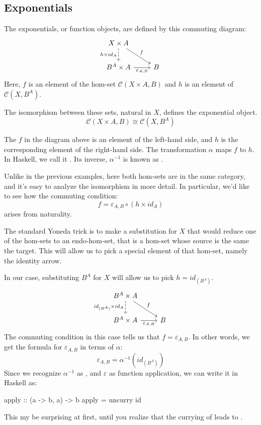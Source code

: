 \documentclass[DaoFP]{subfiles}
\begin{document}
\subsection{Exponentials}

The exponentials, or function objects, are defined by this commuting diagram:
\[
 \begin{tikzcd}
 X \times A
 \arrow[d, dashed, "h \times id_A"']
 \arrow[rd, "f"]
 \\
 B^A \times A
 \arrow[r, "\varepsilon_{A, B}"']
& B
 \end{tikzcd}
\]
Here, $f$ is an element of the hom-set $\mathcal{C}(X \times A, B)$ and $h$ is an element of $\mathcal{C}(X, B^A)$. 

The isomorphism between these sets, natural in $X$, defines the exponential object. 
\[\mathcal{C}(X \times A, B) \cong \mathcal{C}(X, B^A)\]

The $f$ in the diagram above is an element of the left-hand side, and $h$ is the corresponding element of the right-hand side. The transformation $\alpha$ maps $f$ to $h$. In Haskell, we call it . Its inverse, $\alpha^{-1}$ is known as .

Unlike in the previous examples, here both hom-sets are in the same category, and it's easy to analyze the isomorphism in more detail. In particular, we'd like to see how the commuting condition:
\[  f = \varepsilon_{A, B} \circ (h \times id_A) \]
arises from naturality.

The standard Yoneda trick is to make a substitution for $X$ that would reduce one of the hom-sets to an endo-hom-set, that is a hom-set whose source is the same the target. This will allow us to pick a special element of that hom-set, namely the identity arrow.

In our case, substituting $B^A$ for $X$ will allow us to pick $h = id_{(B^A)}$.
\[
 \begin{tikzcd}
 B^A \times A
 \arrow[d, dashed, "id_{(B^A)} \times id_A"']
 \arrow[rd, "f"]
 \\
 B^A \times A
 \arrow[r, "\varepsilon_{A, B}"']
& B
 \end{tikzcd}
\]
The commuting condition in this case tells us that $f = \varepsilon_{A, B}$. In other words, we get the formula for $\varepsilon_{A, B}$ in terms of $\alpha$:
\[ \varepsilon_{A, B} = \alpha^{-1} (id_{(B^A)}) \]
Since we recognize $\alpha^{-1}$ as , and $\varepsilon$ as function application, we can write it in Haskell as:
\begin{haskell}
apply :: (a -> b, a) -> b
apply = uncurry id
\end{haskell}
This my be surprising at first, until you realize that the currying of  leads to .
\end{document}
